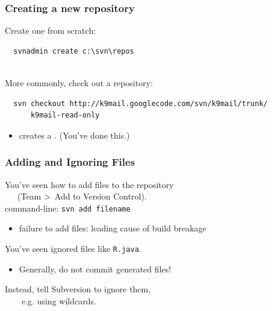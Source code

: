 \begin{frame}[fragile]

\frametitle{Creating a new repository}

\begin{changemargin}{2.5cm}
Create one from scratch:

{\scriptsize \begin{verbatim}  svnadmin create c:\svn\repos\end{verbatim}}

~\\[1em]
More commonly, check out a repository:
\end{changemargin}

{\scriptsize \begin{verbatim}  svn checkout http://k9mail.googlecode.com/svn/k9mail/trunk/
      k9mail-read-only\end{verbatim}}

\begin{changemargin}{2.5cm}
\begin{itemize}
\item creates a . (You've done this.)
\end{itemize}
\end{changemargin}

\end{frame}
\begin{frame}
\frametitle{Adding and Ignoring Files}
\begin{changemargin}{1cm}
You've seen how to add files to the repository \\~~~(Team \textgreater~Add to Version Control).\\

command-line: {\tt svn add filename}\\

\begin{itemize}
\item failure to add files: leading cause of build breakage
\end{itemize}

You've seen ignored files like {\tt R.java}.

\begin{itemize}
\item Generally, do \alert{not} commit generated files!
\end{itemize}
Instead, tell Subversion to ignore them, \\ ~~~~e.g. using wildcards.

\end{changemargin}
\end{frame}

